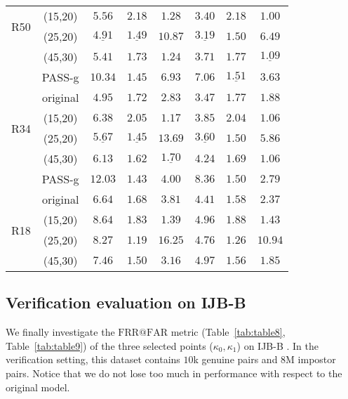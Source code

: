 \documentclass[nohyperref]{article}
\theoremstyle{plain}
\theoremstyle{definition}
\theoremstyle{remark}
\begin{document}
\begin{table}
\begin{tabular}{ c | c | ccc | ccc}
  \multirow{2}{*}{R50}        & (15,20) & $5.56$ & $2.18$ & $1.28$ &  $3.40$ & $2.18$ & $\mathbf{1.00}$  \\
                              & (25,20) & $\underline{4.91}$ & $\underline{1.49}$ & $10.87$&  $\underline{3.19}$ & $\mathbf{1.50}$ & $6.49$  \\
                              & (45,30) & $5.41$ & $1.73$ & $\mathbf{1.24}$ &  $3.71$ & $1.77$ & $\underline{1.09}$  \\ 
                              & PASS-g & $10.34$ & $\mathbf{1.45}$ & $6.93$ &  $7.06$ & $\underline{1.51}$ & $3.63$  \\ \hline 
                              & original  & $\mathbf{4.95}$ & $1.72$ & $2.83$ &  $\mathbf{3.47}$ & $1.77$ & $1.88$  \\
\multirow{2}{*}{R34}          & (15,20) & $6.38$ & $2.05$ & $\mathbf{1.17}$ &  $3.85$ & $2.04$ & $\mathbf{1.06}$  \\
                              & (25,20) & $\underline{5.67}$ & $\underline{1.45}$ & $13.69$&  $\underline{3.60}$ & $\mathbf{1.50}$ & $5.86$  \\
                              & (45,30) & $6.13$ & $1.62$ & $\underline{1.70}$ &  $4.24$ & $1.69$ & $\mathbf{1.06}$  \\
                              & PASS-g & $12.03$ & $\mathbf{1.43}$ & $4.00$ &  $8.36$ & $\mathbf{1.50}$ & $2.79$  \\ \hline 
                              & original  & $\mathbf{6.64}$ & $1.68$ & $3.81$ &  $\mathbf{4.41}$ & $1.58$ & $2.37$  \\
  \multirow{2}{*}{R18}        & (15,20) & $8.64$ & $1.83$ & $\mathbf{1.39}$ &  $4.96$ & $1.88$ & $\mathbf{1.43}$  \\
                              & (25,20) & $8.27$ & $\mathbf{1.19}$ & $16.25$&  $4.76$ & $\mathbf{1.26}$ & $10.94$ \\
                              & (45,30) & $7.46$ & $1.50$ & $3.16$ &  $4.97$ & $1.56$ & $1.85$  \\ \hline 
\end{tabular}
\label{tab:table7}
\end{table}


\subsection{Verification evaluation on IJB-B}

We finally investigate the $\mathrm{FRR}@\mathrm{FAR}$ metric (Table~\ref{tab:table8}, Table~\ref{tab:table9}) of the three selected points ($\kappa_0, \kappa_1$) on IJB-B \cite{whitelam2017iarpa}. In the verification setting, this dataset contains $10$k genuine pairs and $8$M impostor pairs. Notice that we do not lose too much in performance with respect to the original model.
\end{document}
